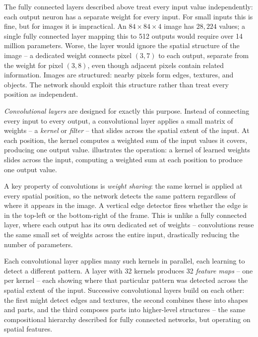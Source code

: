 The fully connected layers described above treat every input value
independently: each output neuron has a separate weight for every
input. For small inputs this is fine, but for images it is
impractical. An $84 \times 84 \times 4$ image has $28{,}224$
values; a single fully connected layer mapping this to 512 outputs
would require over 14 million parameters. Worse, the layer would
ignore the spatial structure of the image -- a dedicated weight
connects pixel $(3, 7)$ to each output, separate from the weight
for pixel $(3, 8)$, even though adjacent pixels contain related
information. Images are structured: nearby pixels form edges,
textures, and objects. The network should exploit this structure
rather than treat every position as independent.

\smallskip
\emph{Convolutional layers} are designed for exactly this purpose.
Instead of connecting every input to every output, a convolutional
layer applies a small matrix of weights -- a \emph{kernel} or
\emph{filter} -- that slides across the spatial extent of the
input. At each position, the kernel computes a weighted sum of the
input values it covers, producing one output value.
 illustrates the operation: a kernel of
learned weights slides across the input, computing a weighted sum
at each position to produce one output value.



\smallskip
A key property of convolutions is \emph{weight sharing}: the same
kernel is applied at every spatial position, so the network detects
the same pattern regardless of where it appears in the image. A
vertical edge detector fires whether the edge is in the top-left or
the bottom-right of the frame. This is unlike a fully connected
layer, where each output has its own dedicated set of weights --
convolutions reuse the same small set of weights across the entire
input, drastically reducing the number of parameters.

\smallskip
Each convolutional layer applies many such kernels in parallel, each
learning to detect a different pattern. A layer with 32 kernels
produces 32 \emph{feature maps} -- one per kernel -- each showing
where that particular pattern was detected across the spatial extent
of the input. Successive convolutional layers build on each other:
the first might detect edges and textures, the second combines
these into shapes and parts, and the third composes parts into
higher-level structures -- the same compositional hierarchy
described for fully connected networks, but operating on spatial
features.

